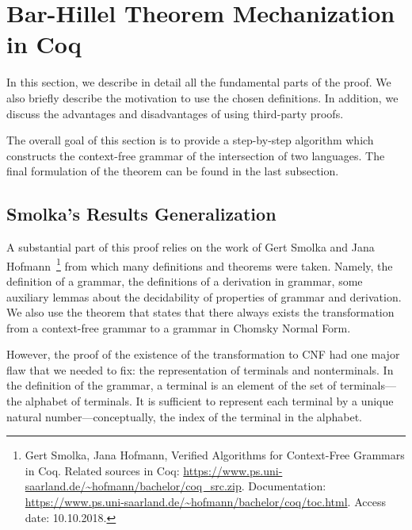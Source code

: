 \section{Bar-Hillel Theorem Mechanization in Coq}
\label{sec:main}

In this section, we describe in detail all the fundamental parts of the proof.
We also briefly describe the motivation to use the chosen definitions.
In addition, we discuss the advantages and disadvantages of using third-party proofs.

The overall goal of this section is to provide a step-by-step algorithm which constructs the context-free grammar of the intersection of two languages.
The final formulation of the theorem can be found in the last subsection.

\subsection{ Smolka's Results Generalization}
\label{sec:solka-generalized}

A substantial part of this proof relies on the work of Gert Smolka and Jana Hofmann~\cite{smolkaHofmann2016}\footnote{Gert Smolka, Jana Hofmann, Verified Algorithms for Context-Free Grammars in Coq. Related sources in Coq: \url{https://www.ps.uni-saarland.de/~hofmann/bachelor/coq_src.zip}. Documentation: \url{https://www.ps.uni-saarland.de/~hofmann/bachelor/coq/toc.html}. Access date: 10.10.2018.} from which many definitions and theorems were taken. Namely, the definition of a grammar, the definitions of a derivation in grammar, some auxiliary lemmas about the decidability of properties of grammar and derivation. We also use the theorem that states that there always exists the transformation from a context-free grammar to a grammar in Chomsky Normal Form.

However, the proof of the existence of the transformation to CNF had one major flaw that we needed to fix: the representation of terminals and nonterminals.
In the definition of the grammar, a terminal is an element of the set of terminals---the alphabet of terminals.
It is sufficient to represent each terminal by a unique natural number---conceptually, the index of the terminal in the alphabet.


